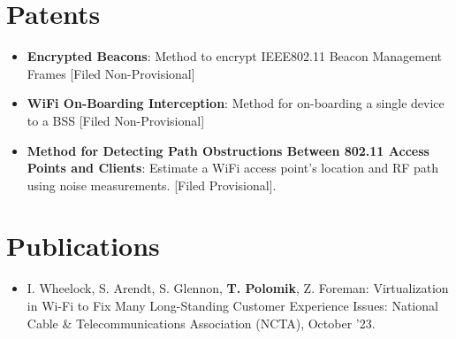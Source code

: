 \documentclass[letterpaper,11pt]{article}
\newcommand{\resumeSubHeadingListStart}{\begin{itemize}[leftmargin=*]}
\newcommand{\resumeSubHeadingListEnd}{\end{itemize}}
\begin{document}
	
	\section{Patents}
	\resumeSubHeadingListStart
	\item{
		\textbf{Encrypted Beacons}{: Method to encrypt IEEE802.11 Beacon Management Frames [Filed Non-Provisional]}
	}
	\item{
		\textbf{WiFi On-Boarding Interception}{: Method for on-boarding a single device to a BSS [Filed Non-Provisional]}	
	}
	\item{
		\textbf{Method for Detecting Path Obstructions Between 802.11 Access Points and Clients}{: Estimate a WiFi access point's location and RF path using noise measurements. [Filed Provisional].}
	}
	\resumeSubHeadingListEnd
	
	\section{Publications}
	\resumeSubHeadingListStart
	\item{ I. Wheelock, S. Arendt, S. Glennon, \textbf{T. Polomik}, Z. Foreman: Virtualization in Wi-Fi to Fix Many Long-Standing Customer Experience Issues: National Cable \& Telecommunications Association (NCTA), October '23.
	}
	\resumeSubHeadingListEnd
	
\end{document}
